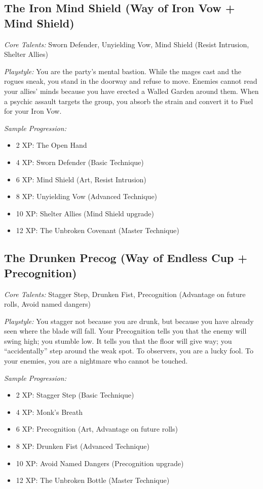 \documentclass[11pt]{book}
\begin{document}
\subsection{The Iron Mind Shield (Way of Iron Vow + Mind Shield)}

\textit{Core Talents:} Sworn Defender, Unyielding Vow, Mind Shield (Resist Intrusion, Shelter Allies)

\textit{Playstyle:} You are the party's mental bastion. While the mages cast and the rogues sneak, you stand in the doorway and refuse to move. Enemies cannot read your allies' minds because you have erected a Walled Garden around them. When a psychic assault targets the group, you absorb the strain and convert it to Fuel for your Iron Vow.

\textit{Sample Progression:}
\begin{itemize}
    \item 2 XP: The Open Hand
    \item 4 XP: Sworn Defender (Basic Technique)
    \item 6 XP: Mind Shield (Art, Resist Intrusion)
    \item 8 XP: Unyielding Vow (Advanced Technique)
    \item 10 XP: Shelter Allies (Mind Shield upgrade)
    \item 12 XP: The Unbroken Covenant (Master Technique)
\end{itemize}

\subsection{The Drunken Precog (Way of Endless Cup + Precognition)}

\textit{Core Talents:} Stagger Step, Drunken Fist, Precognition (Advantage on future rolls, Avoid named dangers)

\textit{Playstyle:} You stagger not because you are drunk, but because you have already seen where the blade will fall. Your Precognition tells you that the enemy will swing high; you stumble low. It tells you that the floor will give way; you ``accidentally'' step around the weak spot. To observers, you are a lucky fool. To your enemies, you are a nightmare who cannot be touched.

\textit{Sample Progression:}
\begin{itemize}
    \item 2 XP: Stagger Step (Basic Technique)
    \item 4 XP: Monk's Breath
    \item 6 XP: Precognition (Art, Advantage on future rolls)
    \item 8 XP: Drunken Fist (Advanced Technique)
    \item 10 XP: Avoid Named Dangers (Precognition upgrade)
    \item 12 XP: The Unbroken Bottle (Master Technique)
\end{itemize}
\end{document}
